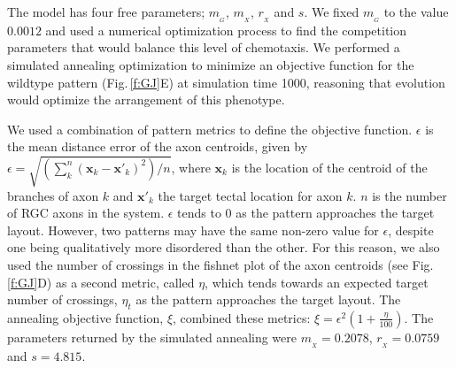 \documentclass[9pt,lineno]{elife}
\begin{document}
The model has four free parameters; $m_{\!_G}$, $m_{\!_X}$, $r_{\!_X}$ and $s$. We fixed $m_{\!_G}$ to the value $0.0012$ and used a numerical optimization process to find the competition parameters that would balance this level of chemotaxis.
We performed a simulated annealing optimization to minimize an objective function for the wildtype pattern (Fig.\,\ref{f:GJ}E) at simulation time 1000, reasoning that evolution would optimize the arrangement of this phenotype.

We used a combination of pattern metrics to define the objective function. $\epsilon$ is the mean distance error of the axon centroids, given by $\epsilon = \sqrt{\left(\sum_k^n (\mathbf{x}_{k} - \mathbf{x}'_{k})^2\right)/n}$,
%
%
where $\mathbf{x}_{k}$ is the location of the centroid of the branches of axon $k$ and $\mathbf{x}'_{k}$ the target tectal location for axon $k$.
$n$ is the number of RGC axons in the system.
%
$\epsilon$ tends to 0 as the pattern approaches the target layout.
However, two patterns may have the same non-zero value for $\epsilon$, despite one being qualitatively more disordered than the other. 
For this reason, we also used the number of crossings in the fishnet plot of the axon centroids (see Fig.\,\ref{f:GJ}D) as a second metric, called $\eta$, which tends towards an expected target number of crossings, $\eta_t$ as the pattern approaches the target layout. The annealing objective function, $\xi$, combined these metrics: $\xi = \epsilon^2 (1+\frac{\eta}{100})$.
The parameters returned by the simulated annealing were
$m_{\!_X} = 0.2078$, $r_{\!_X} = 0.0759$ and $s = 4.815$. 
\end{document}
